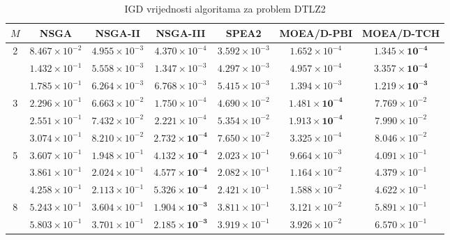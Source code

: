 \documentclass[times, utf8, zavrsni, numeric]{fer}
\begin{document}
\begin{table}[htb]
\caption{IGD vrijednosti algoritama za problem DTLZ2}
\label{tbl:dtlz2}
\centering
\small
\begin{tabular}{c|c|c|c|c|c|c} \hline
$M$ & NSGA & NSGA-II & NSGA-III & SPEA2 & MOEA/D-PBI & MOEA/D-TCH  \\ \hline
\multirow{3}{*}{2}  & $8.467\times 10^{-2}$    & $4.955\times 10^{-3}$ & $4.370\times 10^{-4}$ & $3.592\times 10^{-3}$ & $1.652\times 10^{-4}$ & $\mathbf{1.345\times 10^{-4}}$\\
			        & $1.432\times 10^{-1}$    & $5.558\times 10^{-3}$ & $1.347\times 10^{-3}$ & $4.297\times 10^{-3}$ & $4.957\times 10^{-4}$ & $\mathbf{3.357\times 10^{-4}}$\\
                    & $1.785\times 10^{-1}$    & $6.264\times 10^{-3}$ & $6.768\times 10^{-3}$ & $5.415\times 10^{-3}$ & $1.394\times 10^{-3}$ & $\mathbf{1.219\times 10^{-3}}$\\ \hline
\multirow{3}{*}{3}  & $2.296\times 10^{-1}$    & $6.663\times 10^{-2}$ & $1.750\times 10^{-4}$ & $4.690\times 10^{-2}$ & $\mathbf{1.481\times 10^{-4}}$ & $7.769\times 10^{-2}$\\
			        & $2.551\times 10^{-1}$    & $7.432\times 10^{-2}$ & $2.221\times 10^{-4}$ & $5.354\times 10^{-2}$ & $\mathbf{1.913\times 10^{-4}}$ & $7.990\times 10^{-2}$\\
                    & $3.074\times 10^{-1}$    & $8.210\times 10^{-2}$ & $\mathbf{2.732\times 10^{-4}}$ & $7.650\times 10^{-2}$ & $3.325\times 10^{-4}$ & $8.046\times 10^{-2}$\\ \hline
\multirow{3}{*}{5}  & $3.607\times 10^{-1}$    & $1.948\times 10^{-1}$ & $\mathbf{4.132\times 10^{-4}}$ & $2.023\times 10^{-1}$ & $9.664\times 10^{-3}$ & $4.091\times 10^{-1}$\\
			        & $3.861\times 10^{-1}$    & $2.024\times 10^{-1}$ & $\mathbf{4.577\times 10^{-4}}$ & $2.082\times 10^{-1}$ & $1.164\times 10^{-2}$ & $4.379\times 10^{-1}$\\
                    & $4.258\times 10^{-1}$    & $2.113\times 10^{-1}$ & $\mathbf{5.326\times 10^{-4}}$ & $2.421\times 10^{-1}$ & $1.588\times 10^{-2}$ & $4.622\times 10^{-1}$\\ \hline
\multirow{3}{*}{8}  & $5.243\times 10^{-1}$    & $3.604\times 10^{-1}$ & $\mathbf{1.904\times 10^{-3}}$ & $3.811\times 10^{-1}$ & $3.121\times 10^{-2}$ & $5.891\times 10^{-1}$\\
			        & $5.803\times 10^{-1}$    & $3.701\times 10^{-1}$ & $\mathbf{2.185\times 10^{-3}}$ & $3.919\times 10^{-1}$ & $3.926\times 10^{-2}$ & $6.570\times 10^{-1}$\\

\end{tabular}
\end{table}
\end{document}

